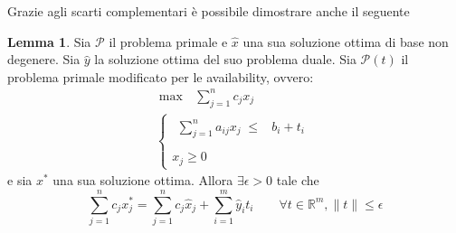 \documentclass{article}[10pt]
\theoremstyle{theorem}
\theoremstyle{definition}
\theoremstyle{definition}
\newtheorem{lemma}{Lemma}[section]
\theoremstyle{definition}
\begin{document}
	Grazie agli scarti complementari è possibile dimostrare anche il seguente
	\begin{lemma}
		Sia $\mathcal{P}$ il problema primale e $\hat{x}$ una sua soluzione ottima di base non degenere. Sia $\hat{y}$ la soluzione ottima del suo problema duale. Sia $\mathcal{P}(t)$ il problema primale modificato per le availability, ovvero:
		\[
		\begin{array}{l}
		\max \mbox{\ }\sum_{j=1}^{n}c_jx_j\\
		\left\{
		\begin{array}{l}
		\begin{array}{rr}
		\sum_{j=1}^{n}a_{ij}x_j \;\leq & b_i + t_i \\
		\end{array} \\
		x_j  \geq 0    
		\end{array}
		\right.
		\end{array}
		\]		
		e sia $x^*$ una sua soluzione ottima. Allora $\exists \epsilon > 0$ tale che
		\begin{equation} \label{opt}
		\sum_{j=1}^{n}c_jx_j^*=\sum_{j=1}^{n}c_j\hat{x}_j + \sum_{i=1}^{m}\hat{y}_it_i \qquad \forall{}t\in\mathbb{R}^m, \lVert t\rVert\leq \epsilon
		\end{equation}
	\end{lemma}
\end{document}
